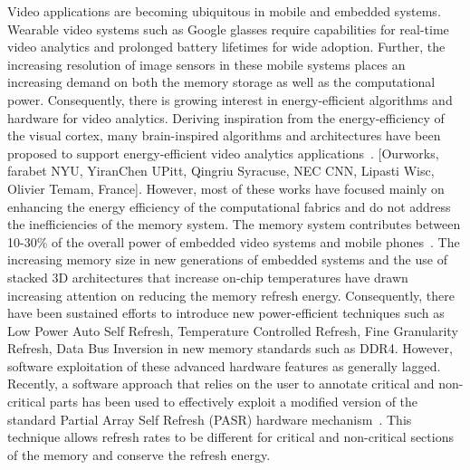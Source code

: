 Video applications are becoming ubiquitous in mobile and embedded systems. Wearable video systems such as Google glasses require capabilities for real-time video analytics and prolonged battery lifetimes for wide adoption.  Further, the increasing resolution of image sensors in these mobile systems places an increasing demand on both the memory storage as well as the computational power. Consequently, there is growing interest in energy-efficient algorithms and hardware for video analytics. 
Deriving inspiration from the energy-efficiency of the visual cortex, many brain-inspired algorithms and architectures have been proposed to support energy-efficient video analytics applications~\cite{Nere2011,Chen2014,Kestur2012,Maashri2012a}. [Ourworks, farabet NYU, YiranChen UPitt, Qingriu Syracuse, NEC CNN, Lipasti Wisc, Olivier Temam, France]. However, most of these works have focused mainly on enhancing the energy efficiency of the computational fabrics and do not address the inefficiencies of the memory system. The memory system contributes between 10-30\% of the overall power of embedded video systems and mobile phones~\cite{CarrollAaronHeiser2010}. The increasing memory size in new generations of embedded systems and the use of stacked 3D architectures that increase on-chip temperatures have drawn increasing attention on reducing the memory refresh energy. Consequently, there have been sustained efforts to introduce new power-efficient techniques such as Low Power Auto Self Refresh, Temperature Controlled Refresh, Fine Granularity Refresh, Data Bus Inversion in new memory standards such as DDR4.  However, software exploitation of these advanced hardware features as generally lagged. Recently, a software approach that relies on the user to annotate critical and non-critical parts has been used to effectively exploit a modified version of the standard Partial Array Self Refresh (PASR) hardware mechanism~\cite{Liu2011}. This technique allows refresh rates to be different for critical and non-critical sections of the memory and conserve the refresh energy. 

